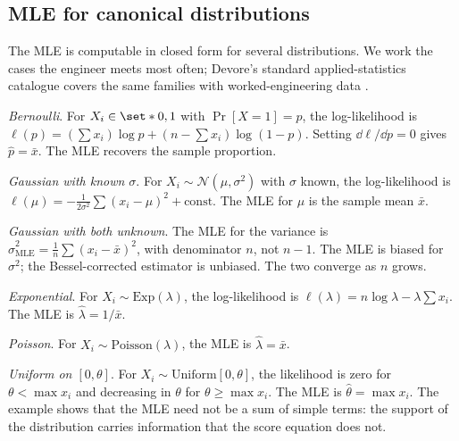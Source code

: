 \subsection{MLE for canonical distributions}

The MLE is computable in closed form for several distributions. We
work the cases the engineer meets most often; Devore's standard
applied-statistics catalogue covers the same families with
worked-engineering data \cite[ch.~6, ch.~7]{text:devore2015}.

\textit{Bernoulli}. For $X_{i} \in \set*{0, 1}$ with $\Pr[X = 1] =
p$, the log-likelihood is $\ell(p) = (\sum x_{i})\log p +
(n - \sum x_{i})\log(1-p)$. Setting $\dd\ell/\dd p = 0$ gives
$\hat{p} = \bar{x}$. The MLE recovers the sample proportion.

\textit{Gaussian with known $\sigma$}. For $X_{i} \sim
\mathcal{N}(\mu, \sigma^{2})$ with $\sigma$ known, the
log-likelihood is $\ell(\mu) = -\frac{1}{2\sigma^{2}}\sum
(x_{i}-\mu)^{2} + \text{const}$. The MLE for $\mu$ is the sample
mean $\bar{x}$.

\textit{Gaussian with both unknown}. The MLE for the variance is
$\hat{\sigma}^{2}_{\mathrm{MLE}} = \frac{1}{n}\sum(x_{i} -
\bar{x})^{2}$, with denominator $n$, not $n-1$. The MLE is biased
for $\sigma^{2}$; the Bessel-corrected estimator is unbiased. The
two converge as $n$ grows.

\textit{Exponential}. For $X_{i} \sim \mathrm{Exp}(\lambda)$, the
log-likelihood is $\ell(\lambda) = n\log\lambda - \lambda \sum
x_{i}$. The MLE is $\hat{\lambda} = 1/\bar{x}$.

\textit{Poisson}. For $X_{i} \sim \mathrm{Poisson}(\lambda)$, the
MLE is $\hat{\lambda} = \bar{x}$.

\textit{Uniform on $[0, \theta]$}. For $X_{i} \sim
\mathrm{Uniform}[0, \theta]$, the likelihood is zero for $\theta <
\max x_{i}$ and decreasing in $\theta$ for $\theta \geq \max x_{i}$.
The MLE is $\hat{\theta} = \max x_{i}$. The example shows that the
MLE need not be a sum of simple terms: the support of the
distribution carries information that the score equation does not.


